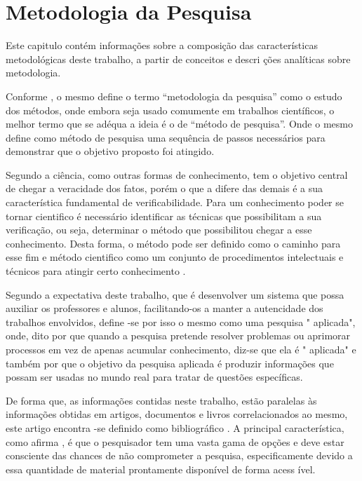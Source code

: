 \chapter{Metodologia da Pesquisa}

Este capitulo contém informações sobre a
composição das características metodológicas
deste trabalho, a partir de conceitos e descri
ções analíticas sobre metodologia.

Conforme \textcite{wazlawick2009}, o mesmo
define o termo “metodologia da pesquisa” como o
estudo dos métodos, onde embora seja usado
comumente em trabalhos científicos, o melhor
termo que se adéqua a ideia é o de “método de
pesquisa”.
Onde o mesmo define como método de pesquisa uma
sequência de passos necessários para demonstrar
que o objetivo proposto foi atingido.

Segundo \textcite{gil2017} a ciência, como
outras formas de conhecimento, tem o objetivo
central de chegar a veracidade dos fatos, porém
o que a difere das demais é a sua característica
fundamental de verificabilidade.
Para um conhecimento poder se tornar cientifico
é necessário identificar as técnicas que
possibilitam a sua verificação, ou seja,
determinar o método que possibilitou chegar a
esse conhecimento.
Desta forma, o método pode ser definido como o
caminho para esse fim e método cientifico como
um conjunto de procedimentos intelectuais e
técnicos para
atingir certo conhecimento \cite{gil2017}.


Segundo a expectativa deste trabalho, que é
desenvolver um sistema que possa auxiliar os
professores e alunos, facilitando-os a manter a
autencidade dos trabalhos envolvidos, define
-se por isso o mesmo como uma pesquisa "
aplicada", onde, dito por \textcite{gil2017} que
quando a pesquisa pretende resolver problemas
ou aprimorar processos em vez de apenas
acumular conhecimento, diz-se que ela é "
aplicada" e também por  que o objetivo da pesquisa aplicada é
produzir informações que possam ser usadas no
mundo real para tratar de questões específicas.


De forma que, as informações contidas neste
trabalho, estão paralelas às informações
obtidas em artigos, documentos e livros
correlacionados ao mesmo, este artigo encontra
-se definido como bibliográfico \cite{
    prodanov2013}.
A principal característica, como afirma \cite{
    gil2017}, é que o pesquisador tem uma vasta
gama de opções e deve estar consciente das
chances de não comprometer a pesquisa,
especificamente devido a essa quantidade de
material prontamente disponível de forma acess
ível.


